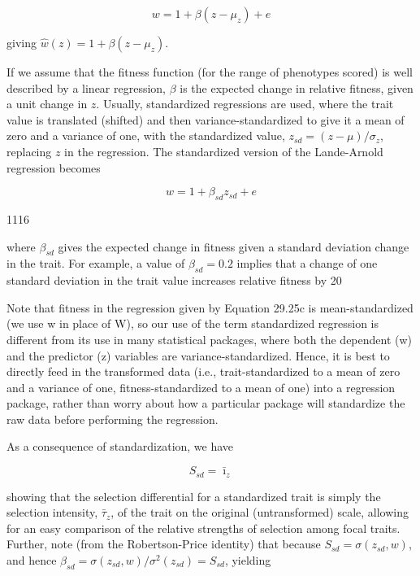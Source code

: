 \documentclass{article}
\begin{document}
\begin{equation}
w=1+\beta(z-\mu_{z})+e
\tag{29.25b}
\label{eq:29_25b}
\end{equation}

giving  $ \widehat{w}(z)=1+\beta(z-\mu_{z}). $

If we assume that the fitness function (for the range of phenotypes scored) is well described by a linear regression,  $ \beta $ is the expected change in relative fitness, given a unit change in  $ z $. Usually, standardized regressions are used, where the trait value is translated (shifted) and then variance-standardized to give it a mean of zero and a variance of one, with the standardized value,  $ z_{sd} = (z - \mu)/\sigma_z $, replacing  $ z $ in the regression. The standardized version of the Lande-Arnold regression becomes

\begin{equation}
w=1+\beta_{sd}z_{sd}+e
\tag{29.25c}
\label{eq:29_25c}
\end{equation}

1116

where  $ \beta_{sd} $ gives the expected change in fitness given a standard deviation change in the trait. For example, a value of  $ \beta_{sd} = 0.2 $ implies that a change of one standard deviation in the trait value increases relative fitness by 20%

Note that fitness in the regression given by Equation 29.25c is mean-standardized (we use w in place of W), so our use of the term standardized regression is different from its use in many statistical packages, where both the dependent (w) and the predictor (z) variables are variance-standardized. Hence, it is best to directly feed in the transformed data (i.e., trait-standardized to a mean of zero and a variance of one, fitness-standardized to a mean of one) into a regression package, rather than worry about how a particular package will standardize the raw data before performing the regression.

As a consequence of standardization, we have

\begin{equation}
S_{sd}=\bar{\imath}_{z}
\tag{29.25d}
\label{eq:29_25d}
\end{equation}

showing that the selection differential for a standardized trait is simply the selection intensity,  $ \bar{\tau}_z $, of the trait on the original (untransformed) scale, allowing for an easy comparison of the relative strengths of selection among focal traits. Further, note (from the Robertson-Price identity) that because  $ S_{sd} = \sigma(z_{sd}, w) $, and hence  $ \beta_{sd} = \sigma(z_{sd}, w)/\sigma^2(z_{sd}) = S_{sd} $, yielding
\end{document}
